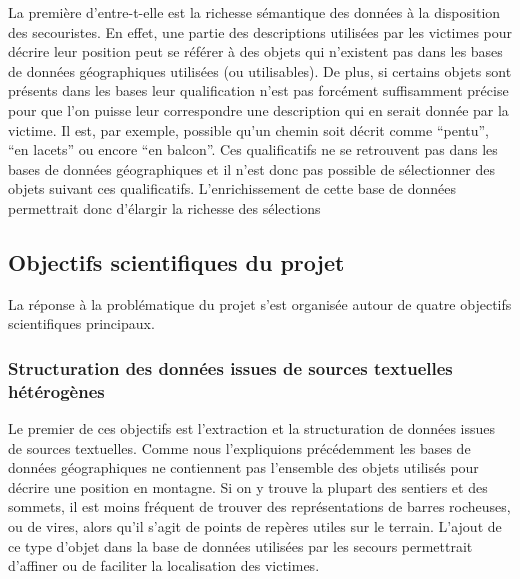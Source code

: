 La première d'entre-t-elle est la richesse sémantique des données à la
disposition des secouristes. En effet, une partie des descriptions
utilisées par les victimes pour décrire leur position peut se référer
à des objets qui n'existent pas dans les bases de données
géographiques utilisées (ou utilisables). De plus, si certains objets
sont présents dans les bases leur qualification n'est pas forcément
suffisamment précise pour que l'on puisse leur correspondre une
description qui en serait donnée par la victime. Il est, par exemple,
possible qu'un chemin soit décrit comme \enquote{pentu}, \enquote{en
  lacets} ou encore \enquote{en balcon}. Ces qualificatifs ne se
retrouvent pas dans les bases de données géographiques et il n'est
donc pas possible de sélectionner des objets suivant ces
qualificatifs. L'enrichissement de cette base de données permettrait
donc d'élargir la richesse des sélections





\subsection{Objectifs scientifiques du projet}
\label{subsec:1-2-3}

La réponse à la problématique du projet s'est organisée autour de
quatre objectifs scientifiques principaux.

\subsubsection{Structuration des données issues de sources textuelles
  hétérogènes}
\label{subsec:1-2-3-1}

Le premier de ces objectifs est l'extraction et la structuration de
données issues de sources textuelles. Comme nous l’expliquions
précédemment les bases de données géographiques ne contiennent pas
l'ensemble des objets utilisés pour décrire une position en
montagne. Si on y trouve la plupart des sentiers et des sommets, il
est moins fréquent de trouver des représentations de barres rocheuses,
ou de vires, alors qu'il s'agit de points de repères utiles sur le
terrain. L'ajout de ce type d'objet dans la base de données utilisées
par les secours permettrait d’affiner ou de faciliter la localisation
des victimes.

